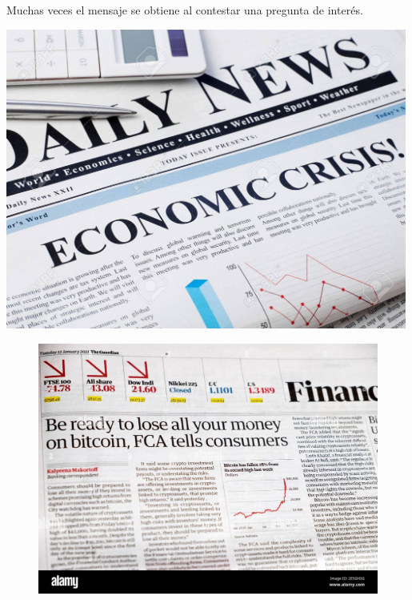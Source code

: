 \documentclass[
  letterpaper,
  DIV=11,
  numbers=noendperiod]{scrartcl}
\begin{document}
Muchas veces el mensaje se obtiene al contestar una pregunta de interés.

\includegraphics[width=5.19792in,height=\textheight]{images/clipboard-1758479249.png}

\begin{figure}

{\centering 

\href{https://www.google.com/url?sa=i\&url=https\%3A\%2F\%2Fwww.alamy.com\%2Fbe-ready-to-lose-all-your-money-on-bitcoin-fca-tells-consumers-financial-newspaper-headline-in-guardian-12-january-2021-great-britain-uk-europe-image399276404.html\&psig=AOvVaw1j_DY1hqJ8N6YDmcJrt7O4\&ust=1706894768727000\&source=images\&cd=vfe\&opi=89978449\&ved=0CBIQjRxqFwoTCNiE4-PUioQDFQAAAAAdAAAAABAD}{\includegraphics{Introduccion_files/mediabag/be-ready-to-lose-all.jpg}}

}

\end{figure}
\end{document}
